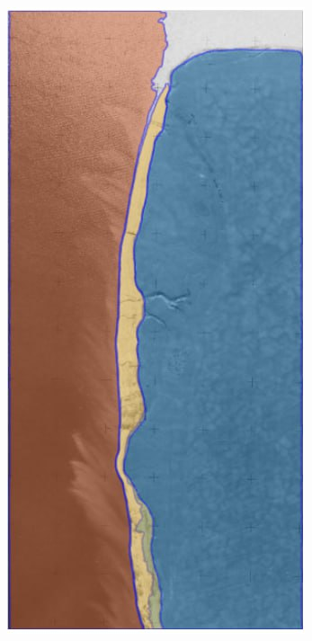 \documentclass[handout]{beamer}
\begin{document}
\begin{frame}
\begin{columns}
\begin{column}{0.25\linewidth}
    \end{column}
    \begin{column}{0.25\linewidth}
      \includegraphics[width=1\linewidth]{sa-photo-result.png}

\end{column}
\end{columns}
\end{frame}
\end{document}
